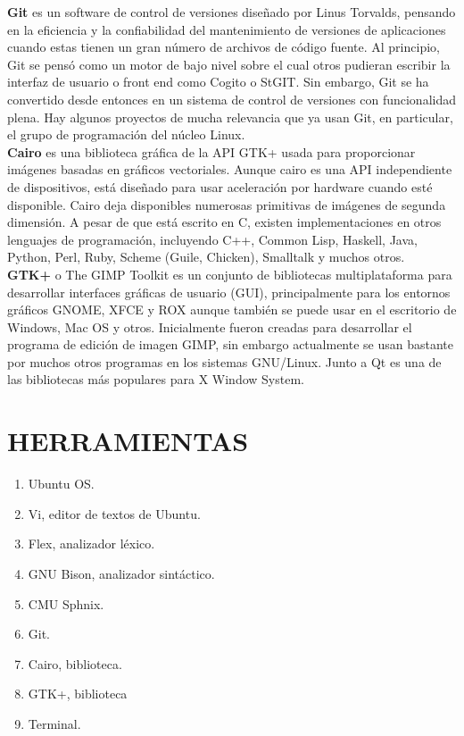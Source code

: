 \documentclass{article}
\begin{document}
{\bf Git} es un software de control de versiones diseñado por Linus Torvalds, pensando en la eficiencia y la confiabilidad del mantenimiento de versiones de aplicaciones cuando estas tienen un gran número de archivos de código fuente. Al principio, Git se pensó como un motor de bajo nivel sobre el cual otros pudieran escribir la interfaz de usuario o front end como Cogito o StGIT. Sin embargo, Git se ha convertido desde entonces en un sistema de control de versiones con funcionalidad plena. Hay algunos proyectos de mucha relevancia que ya usan Git, en particular, el grupo de programación del núcleo Linux.\\

{\bf Cairo}  es una biblioteca gráfica de la API GTK+ usada para proporcionar imágenes basadas en gráficos vectoriales. Aunque cairo es una API independiente de dispositivos, está diseñado para usar aceleración por hardware cuando esté disponible. Cairo deja disponibles numerosas primitivas de imágenes de segunda dimensión. A pesar de que está escrito en C, existen implementaciones en otros lenguajes de programación, incluyendo C++, Common Lisp, Haskell, Java, Python, Perl, Ruby, Scheme (Guile, Chicken), Smalltalk y muchos otros.\\

{\bf GTK+} o The GIMP Toolkit es un conjunto de bibliotecas multiplataforma para desarrollar interfaces gráficas de usuario (GUI), principalmente para los entornos gráficos GNOME, XFCE y ROX aunque también se puede usar en el escritorio de Windows, Mac OS y otros. Inicialmente fueron creadas para desarrollar el programa de edición de imagen GIMP, sin embargo actualmente se usan bastante por muchos otros programas en los sistemas GNU/Linux. Junto a Qt es una de las bibliotecas más populares para X Window System.\\

\section{HERRAMIENTAS}

\begin{enumerate}

\item Ubuntu OS.\\
\item Vi, editor de textos de Ubuntu.\\
\item Flex, analizador léxico.\\
\item GNU Bison, analizador sintáctico.\\
\item CMU Sphnix.\\
\item Git.\\
\item Cairo, biblioteca.\\
\item GTK+, biblioteca\\
\item Terminal.\\

\end{enumerate}
\end{document}

